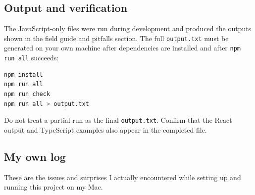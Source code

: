 \documentclass[
]{article}
\newcommand{\passthrough}[1]{#1}
\begin{document}
\subsection{Output and verification}\label{output-and-verification}

The JavaScript-only files were run during development and produced the
outputs shown in the field guide and pitfalls section. The full
\passthrough{\lstinline!output.txt!} must be generated on your own
machine after dependencies are installed and after
\passthrough{\lstinline!npm run all!} succeeds:

\begin{lstlisting}[language=bash]
npm install
npm run all
npm run check
npm run all > output.txt
\end{lstlisting}

Do not treat a partial run as the final
\passthrough{\lstinline!output.txt!}. Confirm that the React output and
TypeScript examples also appear in the completed file.

\subsection{My own log}\label{my-own-log}

These are the issues and surprises I actually encountered while setting
up and running this project on my Mac.
\end{document}
